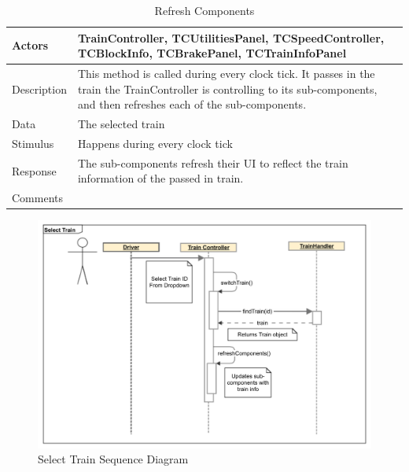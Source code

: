 \documentclass[]{article}
\begin{document}
\begin{table}[H]
	\centering
	\caption{Refresh Components}
	\begin{tabular}{|l|l|}
		\hline
		Actors & \parbox[t]{10cm}{TrainController, TCUtilitiesPanel, TCSpeedController, TCBlockInfo, TCBrakePanel, TCTrainInfoPanel} \\ \hline
		Description & \parbox[t]{10cm}{This method is called during every clock tick. It passes in the train the TrainController is controlling to its sub-components, and then refreshes each of the sub-components.} \\ \hline
		Data &  \parbox[t]{10cm}{The selected train} \\ \hline
		Stimulus &  \parbox[t]{10cm}{ Happens during every clock tick} \\ \hline
		Response & \parbox[t]{10cm}{The sub-components refresh their UI to reflect the train information of the passed in train. }\\ \hline
		Comments & \parbox[t]{10cm}{}  \\ \hline
	\end{tabular}
\end{table}

\begin{figure}[H]
	\centering
	\includegraphics[width=\textwidth]{tc_selectTrain_usecase}
	\caption{Select Train Sequence Diagram}
\end{figure}
\end{document}
